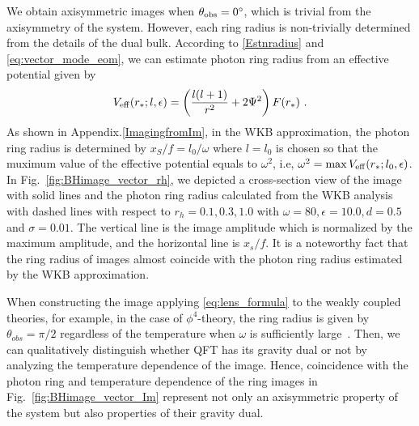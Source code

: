 \documentclass[a4paper,11pt]{article}
\begin{document}
	We obtain axisymmetric %
 images when $\theta_{\rm{obs}}=0^\circ$, which is trivial from the axisymmetry of the system. However, each ring radius is non-trivially determined from the details of the dual bulk. 
	According to \eqref{Estnradius} and \eqref{eq:vector_mode_eom}, we can estimate photon ring radius from an effective potential given by
    \begin{equation}
        \label{eq:effective_potential}
        V_{\rm{eff}}(r_*;l,\epsilon)=\left(\frac{l(l+1)}{r^2}+2\Psi^2\right)F(r_*)\ .
    \end{equation}
As shown in Appendix.\ref{ImagingfromIm}, in the WKB approximation, 
the photon ring radius is determined by $x_S/f = l_0/\omega$ where $l=l_0$ is chosen so that the muximum value of the effective potential equals to $\omega^2$,  i.e, $\omega^2={\rm{max}}\,V_{\rm{eff}}(r_\ast;l_0,\epsilon)$.
In Fig.~\ref{fig:BHimage_vector_rh}, we depicted a cross-section view of the image
with solid lines and the photon ring radius calculated from the WKB analysis with dashed lines with respect to $r_h=0.1,0.3,1.0$ with $\omega=80, \epsilon=10.0, d=0.5$ and $\sigma=0.01$. The vertical line is the image amplitude which is normalized by the maximum amplitude, and the horizontal line is $x_s/f$. It is a noteworthy fact that the ring radius of images almost coincide with the photon ring radius estimated by the WKB approximation.
    
    When constructing the image applying \eqref{eq:lens_formula} to the weakly coupled theories, %
for example, in the case of $\phi^4$-theory, the ring radius is given by $\theta_{obs}=\pi/2$ regardless of the temperature when $\omega$ is sufficiently large~\cite{Hashimoto:2019jmw}. Then, we can qualitatively distinguish whether QFT has its gravity dual or not by analyzing the temperature dependence of the image. Hence, coincidence with the photon ring and temperature dependence of the ring images in Fig.~\ref{fig:BHimage_vector_Im} represent not only an axisymmetric property of the system but also properties of their gravity dual.
\end{document}
